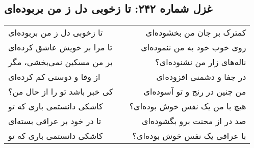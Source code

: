 \begin{center}
\section*{غزل شماره ۲۴۲: تا زخوبی دل ز من بربوده‌ای}
\label{sec:242}
\begin{longtable}{l p{0.5cm} r}
تا زخوبی دل ز من بربوده‌ای
&&
کمترک بر جان من بخشوده‌ای
\\
تا مرا بر خویش عاشق کرده‌ای
&&
روی خوب خود به من ننموده‌ای
\\
بر من مسکین نمی‌بخشی، مگر
&&
ناله‌های زار من نشنوده‌ای؟
\\
از وفا و دوستی کم کرده‌ای
&&
در جفا و دشمنی افزوده‌ای
\\
کی خبر باشد تو را از حال من؟
&&
من چنین در رنج و تو آسوده‌ای
\\
کاشکی دانستمی باری که تو
&&
هیچ با من یک نفس خوش بوده‌ای؟
\\
تا در خود بر عراقی بسته‌ای
&&
صد در از محنت برو بگشوده‌ای
\\
کاشکی دانستمی باری که تو
&&
با عراقی یک نفس خوش بوده‌ای؟
\\
\end{longtable}
\end{center}
